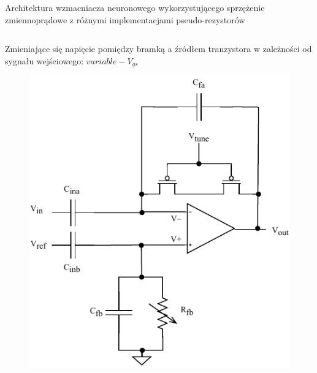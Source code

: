 \begin{frame}{Architektura wzmacniacza neuronowego wykorzystującego sprzężenie zmiennoprądowe z różnymi implementacjami pseudo-rezystorów}
    \begin{columns}[t]

        \vspace{-2em} %

        \begin{alertblock}{Zmieniające się napięcie  pomiędzy bramką a źródłem tranzystora w zależności od sygnału wejściowego: $variable-V_{gs}$}
                 

            \begin{figure}[H]
                \centering
                \includegraphics[scale = 0.55]{Figures/standard.pdf}
            \end{figure}
        \end{alertblock}



        \vspace{-2em} %


\end{columns}
\end{frame}

